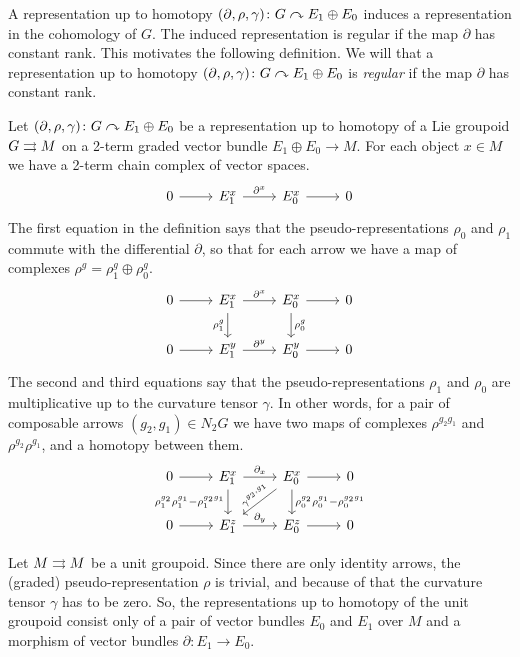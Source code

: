 A representation up to homotopy $(\partial, \rho, \gamma)\colon G\curvearrowright E_1\oplus E_0$ induces a representation in the cohomology of $G$.
The induced representation is regular if the map $\partial$ has constant rank.
This motivates the following definition.
We will that a representation up to homotopy $(\partial, \rho, \gamma)\colon G\curvearrowright E_1\oplus E_0$ is \emph{regular} if the map $\partial$ has constant rank.

Let $(\partial, \rho, \gamma)\colon G\curvearrowright E_1\oplus E_0$ be a representation up to homotopy of a Lie groupoid $G\rightrightarrows M$ on a 2-term graded vector bundle $E_1\oplus E_0\to M$.
For each object $x\in M$ we have a 2-term chain complex of vector spaces.
\begin{equation}
  \begin{tikzcd}
    0 \ar{r} & E_1^x \ar{r}{\partial^x} & E_0^x \ar{r} & 0
  \end{tikzcd}
\end{equation}
The first equation in the definition says that the pseudo-representations $\rho_0$ and $\rho_1$ commute with the differential $\partial$, so that for each arrow  we have a map of complexes $\rho^g = \rho_1^g\oplus\rho_0^g$.
\begin{equation}
  \begin{tikzcd}
    0 \ar{r} & E_1^x \ar{r}{\partial^x} \ar[swap]{d}{\rho_1^g} & E_0^x \ar{r} \ar{d}{\rho_0^g} & 0 \\
    0 \ar{r} & E_1^y \ar{r}{\partial^y} & E_0^y \ar{r} & 0
  \end{tikzcd}
\end{equation}
The second and third equations say that the pseudo-representations $\rho_1$ and $\rho_0$ are multiplicative up to the curvature tensor $\gamma$.
In other words, for a pair of composable arrows $(g_2, g_1)\in N_2G$ we have two maps of complexes $\rho^{g_2g_1}$ and $\rho^{g_2}\rho^{g_1}$, and a homotopy  between them.
\begin{equation}
  \begin{tikzcd}
    0 \ar{r} & E_1^x \ar{r}{\partial_x} \ar[swap]{d}{\rho_1^{g_2}\rho_1^{g_1} - \rho_1^{g_2g_1}} & E_0^x \ar{r} \ar{d}{\rho_0^{g_2}\rho_0^{g_1} - \rho_0^{g_2g_1}} \ar[sloped]{ld}{\gamma^{g_2, g_1}} & 0 \\
    0 \ar{r} & E_1^z \ar{r}{\partial_y} & E_0^z \ar{r} & 0
  \end{tikzcd}
\end{equation}

\begin{example}
Let $M\rightrightarrows M$ be a unit groupoid.
Since there are only identity arrows, the (graded) pseudo-representation $\rho$ is trivial, and because of that the curvature tensor $\gamma$ has to be zero.
So, the representations up to homotopy of the unit groupoid consist only of a pair of vector bundles $E_0$ and $E_1$ over $M$ and a morphism of vector bundles $\partial\colon E_1\to E_0$.
\end{example}

